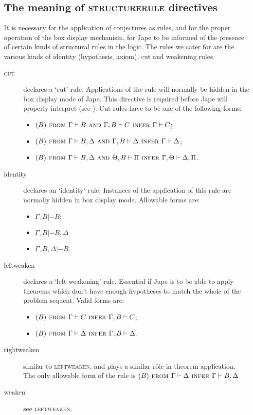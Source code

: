 \subsection{The meaning of \textsc{structurerule} directives}
\label{sec:paraformlang:structurerules}
It is necessary for the application of conjectures as rules, and for the proper operation of the box display mechanism, for Jape to be informed of the presence of certain kinds of structural rules in the logic. The rules we cater for are the various kinds of identity (hypothesis, axiom), cut and weakening rules.

\begin{description}
\item[\textsc{cut}] declares a `cut' rule. Applications of the rule will normally be hidden in the box display mode of Jape. This directive is required before Jape will properly interpret  (see ). Cut rules have to be one of the following forms: 
\begin{itemize}
\item $(B) \textsc{ from } \Gamma |- B \textsc{ and } \Gamma, B |- C \textsc{ infer } \Gamma |- C$; 
\item $(B) \textsc{ from } \Gamma |- B, \Delta \textsc{ and } \Gamma, B |- \Delta \textsc{ infer } \Gamma |- \Delta$;
\item $(B) \textsc{ from } \Gamma |- B, \Delta \textsc{ and } \Theta, B |- \Pi \textsc{ infer } \Gamma, \Theta |- \Delta, \Pi$.
\end{itemize}

\item[identity] declares an `identity' rule. Instances of the application of this rule are normally hidden in box display mode. Allowable forms are:
\begin{itemize}
\item $\Gamma, B |- B$;
\item $\Gamma, B |- B, \Delta$
\item $\Gamma, B, \Delta |- B$.
\end{itemize}

\item[leftweaken] declares a `left weakening' rule. Essential if Jape is to be able to apply theorems which don't have enough hypotheses to match the whole of the problem sequent. Valid forms are:
\begin{itemize}
\item $(B) \textsc{ from } \Gamma |- C \textsc{ infer } \Gamma, B |- C$;
\item $(B) \textsc{ from } \Gamma |- \Delta \textsc{ infer } \Gamma, B |- \Delta$.
\end{itemize}

\item[rightweaken] similar to \textsc{leftweaken}, and plays a similar r\^{o}le in theorem application. The only allowable form of the rule is $(B) \textsc{ from } \Gamma |- \Delta \textsc{ infer } \Gamma |- B, \Delta$

\item[weaken] see \textsc{leftweaken}.

\end{description}

